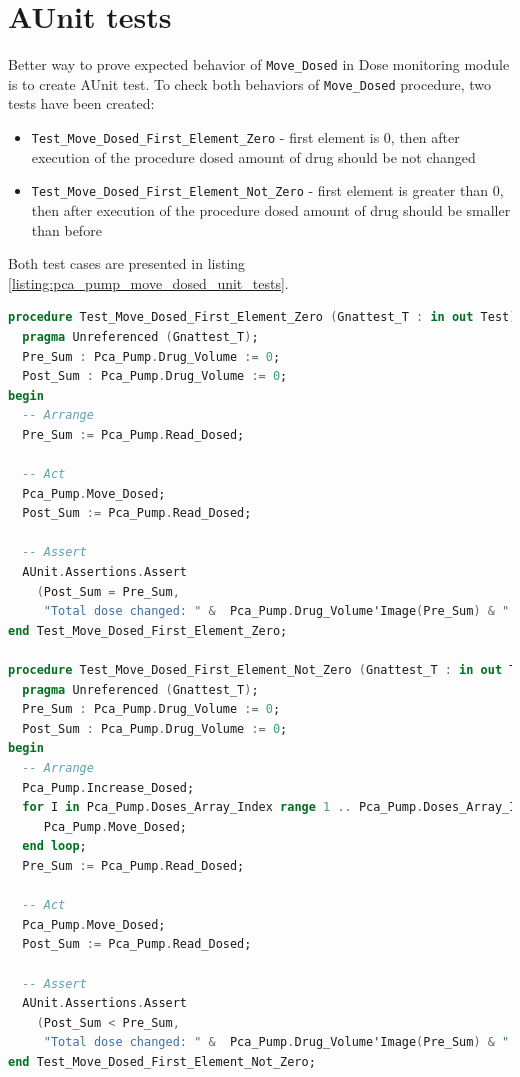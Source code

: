 \section{AUnit tests}
\label{verification:aunit}

Better way to prove expected behavior of \lstinline{Move_Dosed} in Dose monitoring module is to create AUnit test. To check both behaviors of \lstinline{Move_Dosed} procedure, two tests have been created:
\begin{itemize}
    \item \lstinline{Test_Move_Dosed_First_Element_Zero} - first element is 0, then after execution of the procedure dosed amount of drug should be not changed
    \item \lstinline{Test_Move_Dosed_First_Element_Not_Zero} - first element is greater than 0, then after execution of the procedure dosed amount of drug should be smaller than before
\end{itemize}

Both test cases are presented in listing \ref{listing:pca_pump_move_dosed_unit_tests}.

\begin{lstlisting}[language=ada, frame=single, gobble=0, caption={AUnit tests for Move\_Dosed procedure}]
procedure Test_Move_Dosed_First_Element_Zero (Gnattest_T : in out Test) is
  pragma Unreferenced (Gnattest_T);
  Pre_Sum : Pca_Pump.Drug_Volume := 0;
  Post_Sum : Pca_Pump.Drug_Volume := 0;
begin
  -- Arrange
  Pre_Sum := Pca_Pump.Read_Dosed;

  -- Act
  Pca_Pump.Move_Dosed;
  Post_Sum := Pca_Pump.Read_Dosed;

  -- Assert
  AUnit.Assertions.Assert
    (Post_Sum = Pre_Sum,
     "Total dose changed: " &  Pca_Pump.Drug_Volume'Image(Pre_Sum) & " /= " &  Pca_Pump.Drug_Volume'Image(Post_Sum));
end Test_Move_Dosed_First_Element_Zero;

procedure Test_Move_Dosed_First_Element_Not_Zero (Gnattest_T : in out Test) is
  pragma Unreferenced (Gnattest_T);
  Pre_Sum : Pca_Pump.Drug_Volume := 0;
  Post_Sum : Pca_Pump.Drug_Volume := 0;
begin
  -- Arrange
  Pca_Pump.Increase_Dosed;
  for I in Pca_Pump.Doses_Array_Index range 1 .. Pca_Pump.Doses_Array_Index'Last-1 loop
     Pca_Pump.Move_Dosed;
  end loop;
  Pre_Sum := Pca_Pump.Read_Dosed;

  -- Act
  Pca_Pump.Move_Dosed;
  Post_Sum := Pca_Pump.Read_Dosed;

  -- Assert
  AUnit.Assertions.Assert
    (Post_Sum < Pre_Sum,
     "Total dose changed: " &  Pca_Pump.Drug_Volume'Image(Pre_Sum) & " should be greater than " &  Pca_Pump.Drug_Volume'Image(Post_Sum));
end Test_Move_Dosed_First_Element_Not_Zero;
\end{lstlisting}
\label{listing:pca_pump_move_dosed_unit_tests}


